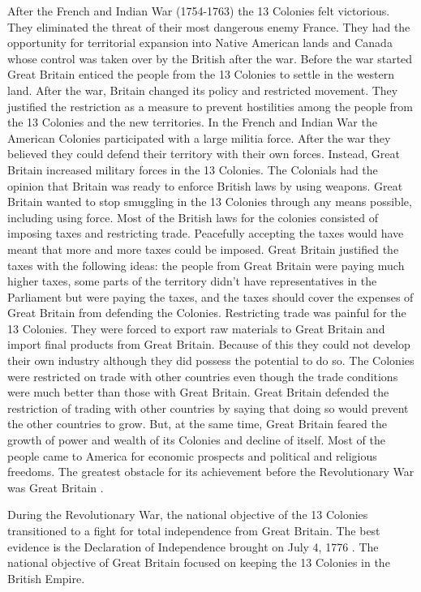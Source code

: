 After the French and Indian War (1754-1763) the 13 Colonies felt victorious.
They eliminated the threat of their most dangerous enemy France.  They had the
opportunity for territorial expansion into Native American lands and Canada
whose control was taken over by the British after the war.  Before the war
started Great Britain enticed the people from the 13 Colonies to settle in the
western land.  After the war, Britain changed its policy and restricted
movement.  They justified the restriction as a measure to prevent hostilities
among the people from the 13 Colonies and the new territories.  In the French
and Indian War the American Colonies participated with a large militia force.
After the war they believed they could defend their territory with their own
forces.  Instead, Great Britain increased military forces in the 13 Colonies.
The Colonials had the opinion that Britain was ready to enforce British laws by
using weapons.  Great Britain wanted to stop smuggling in the 13 Colonies
through any means possible, including using force.  Most of the British laws for
the colonies consisted of imposing taxes and restricting trade.  Peacefully
accepting the taxes would have meant that more and more taxes could be imposed.
Great Britain justified the taxes with the following ideas: the people from
Great Britain were paying much higher taxes, some parts of the territory didn’t
have representatives in the Parliament but were paying the taxes, and the taxes
should cover the expenses of Great Britain from defending the Colonies.
Restricting trade was painful for the 13 Colonies.  They were forced to export
raw materials to Great Britain and import final products from Great Britain.
Because of this they could not develop their own industry although they did
possess the potential to do so.  The Colonies were restricted on trade with
other countries even though the trade conditions were much better than those
with Great Britain.  Great Britain defended the restriction of trading with
other countries by saying that doing so would prevent the other countries to
grow.  But, at the same time, Great Britain feared the growth of power and
wealth of its Colonies and decline of itself.  Most of the people came to
America for economic prospects and political and religious freedoms.  The
greatest obstacle for its achievement before the Revolutionary War was Great
Britain
\cite[76,81-91]{ladenburg_causes_1989}\cite[133-134]{knollenberg_growth_2003}.

During the Revolutionary War, the national objective of the 13 Colonies
transitioned to a fight for total independence from Great Britain.  The best
evidence is the Declaration of Independence brought on July 4, 1776
\cite[119]{ladenburg_causes_1989}.  The national objective of Great Britain
focused on keeping the 13 Colonies in the British Empire.

